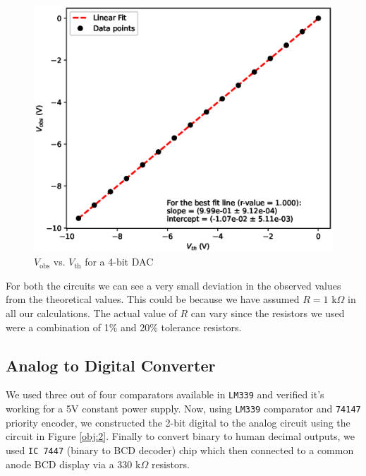 

\begin{figure}
    \centering
    \includegraphics[width=1\columnwidth]{images/4bit.eps}
    \caption{$V_\text{obs}$ vs. $V_\text{th}$ for a 4-bit DAC}
    \label{graph:2}
\end{figure}

For both the circuits we can see a very small deviation in the observed values from the theoretical values. This could be because we have assumed $R=1$ k$\Omega$ in all our calculations. The actual value of $R$ can vary since the resistors we used were a combination of 1\% and 20\% tolerance resistors.


\subsection{Analog to Digital Converter}
We used three out of four comparators available in \verb|LM339| and verified it's working for a 5V constant power supply.
Now, using \verb|LM339| comparator and \verb|74147| priority encoder, we constructed the 2-bit digital to the analog circuit using the circuit in Figure \ref{obj:2}. Finally to convert binary to human decimal outputs, we used \verb|IC 7447| (binary to BCD decoder) chip which then connected to a common anode BCD display via a 330 k$\Omega$ resistors.


